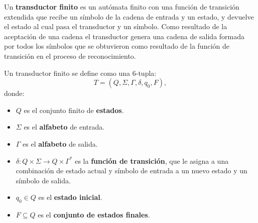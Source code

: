 \begin{definition}
  Un \textbf{transductor finito} es un autómata finito con una función de transición extendida que recibe un símbolo de la cadena de entrada y un estado, y devuelve el estado al cual pasa el transductor y un símbolo.  Como resultado de la aceptación de una cadena el transductor genera una cadena de salida formada por todos los símbolos que se obtuvieron como resultado de la función de transición en el proceso de reconocimiento.
  
  Un transductor finito se define como una 6-tupla:
  \[
    T = (Q, \Sigma, \Gamma, \delta, q_0, F),
  \]
  donde:
  \begin{itemize}
    \item \(Q\) es el conjunto finito de \textbf{estados}.
    \item \(\Sigma\) es el \textbf{alfabeto} de entrada.
    \item \(\Gamma\) es el \textbf{alfabeto} de salida.
    \item \(\delta: Q \times \Sigma \to Q \times \Gamma^*\) es la \textbf{función de transición}, que le asigna a una combinación de estado actual y símbolo de entrada a un nuevo estado y un símbolo de salida.
    \item \(q_0 \in Q\) es el \textbf{estado inicial}.
    \item \(F \subseteq Q\) es el \textbf{conjunto de estados finales}.
  \end{itemize}
\end{definition}


